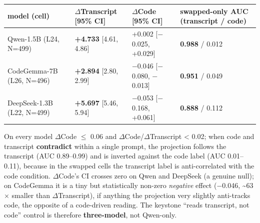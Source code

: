 \documentclass[
  11pt,
  a4paper]{article}
\newcounter{none} %
\begin{document}
{\def\LTcaptype{none} %
\begin{longtable}[]{@{}
  >{\raggedright\arraybackslash}p{}
  >{\raggedright\arraybackslash}p{}
  >{\raggedright\arraybackslash}p{}
  >{\raggedright\arraybackslash}p{}@{}}
\toprule\noalign{}
\begin{minipage}[b]{\linewidth}\raggedright
model (cell)
\end{minipage} & \begin{minipage}[b]{\linewidth}\raggedright
\ensuremath{\Delta}Transcript {[}95\% CI{]}
\end{minipage} & \begin{minipage}[b]{\linewidth}\raggedright
\ensuremath{\Delta}Code {[}95\% CI{]}
\end{minipage} & \begin{minipage}[b]{\linewidth}\raggedright
swapped-only AUC (transcript / code)
\end{minipage} \\
\midrule\noalign{}
\endhead
\bottomrule\noalign{}
\endlastfoot
Qwen-1.5B (L24, N=499) & \textbf{+4.733} {[}4.61, 4.86{]} & +0.002
{[}\ensuremath{-}0.025, +0.029{]} & \textbf{0.988} / 0.012 \\
CodeGemma-7B (L26, N=496) & \textbf{+2.894} {[}2.80, 2.99{]} & \ensuremath{-}0.046
{[}\ensuremath{-}0.080, \ensuremath{-}0.013{]} & \textbf{0.951} / 0.049 \\
DeepSeek-1.3B (L22, N=499) & \textbf{+5.697} {[}5.46, 5.94{]} & \ensuremath{-}0.053
{[}\ensuremath{-}0.168, +0.061{]} & \textbf{0.888} / 0.112 \\
\end{longtable}
}

On every model \textbar \ensuremath{\Delta}Code\textbar{} \ensuremath{\leq} 0.06 and
\textbar \ensuremath{\Delta}Code\textbar/\textbar \ensuremath{\Delta}Transcript\textbar{} \textless{} 0.02;
when code and transcript \textbf{contradict} within a single prompt, the
projection follows the transcript (AUC 0.89--0.99) and is inverted
against the code label (AUC 0.01--0.11), because in the swapped cells
the transcript label is anti-correlated with the code condition. \ensuremath{\Delta}Code's
CI crosses zero on Qwen and DeepSeek (a genuine null); on CodeGemma it
is a tiny but statistically non-zero \emph{negative} effect (\ensuremath{-}0.046,
\textasciitilde63\ensuremath{\times} smaller than \ensuremath{\Delta}Transcript), if anything the projection
very slightly anti-tracks code, the opposite of a code-driven reading.
The keystone ``reads transcript, not code'' control is therefore
\textbf{three-model}, not Qwen-only.
\end{document}
